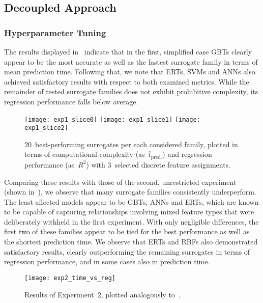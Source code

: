 \subsection{Decoupled Approach}
\label{sec:modelres}

\subsubsection{Hyperparameter Tuning}

The results displayed in~ indicate that in the first,
simplified case GBTs clearly appear to be the most accurate as
well as the fastest surrogate family in terms of mean prediction time. Following
that, we note that ERTs, SVMs and ANNs also achieved satisfactory results with respect to both examined metrics.
While the remainder of tested surrogate families does not exhibit prohibitive
complexity, its regression performance falls below average.

\begin{figure}
	\centering
	\texttt{[image: exp1\_slice0]}
	\texttt{[image: exp1\_slice1]}
	\texttt{[image: exp1\_slice2]}
	\caption{\label{fig:exp1-time-vs-reg}20~best-performing surrogates per each considered family, plotted in
		terms of computational complexity (as~$\overline{t}_{\text{pred.}}$) and regression
		performance (as~$R^2$) with 3~selected discrete feature assignments.}
\end{figure}

Comparing these results with those of the second, unrestricted experiment (shown
in~), we observe that many surrogate families
consistently underperform. The least
affected models appear to be GBTs, ANNs and ERTs, which are known to be capable of capturing relationships
involving mixed feature types that were deliberately withheld in the first
experiment. With only negligible differences, the first two of these families
appear to be tied for the best performance as well as the shortest prediction
time. We observe that ERTs and RBFs also
demonstrated satisfactory results, clearly outperforming the remaining surrogates in
terms of regression performance, and in some cases also in prediction time.

\begin{figure}
	\centering
	\texttt{[image: exp2\_time\_vs\_reg]}
	\caption{\label{fig:exp2-time-vs-reg}Results of Experiment~2, plotted analogously
	to~.}
\end{figure}

